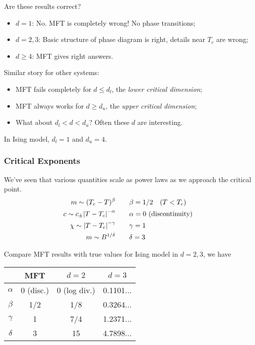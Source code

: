 \documentclass[a4paper,11pt]{article}
\begin{document}
	Are these results correct?
	\begin{itemize}
		\item $d = 1$: No. MFT is completely wrong! No phase transitions;
		\item $d = 2,3$: Basic structure of phase diagram is right, details near $T_c$ are wrong;
		\item $d \geq 4$: MFT gives right answers.
	\end{itemize}

	Similar story for other systems:
	\begin{itemize}
		\item MFT fails completely for $d \leq d_l$, the \emph{lower critical dimension};
		\item MFT always works for $d \geq d_u$, the \emph{upper critical dimension};
		\item What about $d_l < d < d_u$? Often these $d$ are interesting.
	\end{itemize}
	
	In Ising model, $d_l = 1$ and $d_u = 4$.

	\subsubsection{Critical Exponents}

	We've seen that various quantities scale as power laws as we approach the critical point.
	\begin{align*}
		m \sim (T_c - T)^\beta \qquad & \beta = 1/2 \quad (T < T_c)\\
		c \sim c_{\pm} \abs{T - T_c}^{-\alpha} \qquad & \alpha = 0 \text{ (discontinuity)}\\
		\chi \sim \abs{T - T_c}^{-\gamma} \qquad & \gamma = 1\\
		m \sim B^{1/\delta} \qquad & \delta = 3
	\end{align*}

	Compare MFT results with true values for Ising model in $d = 2,3$, we have
	
	\begin{center}
		\begin{tabular}{c|ccc}
			& MFT & $d=2$ & $d=3$ \\
			\hline
			$\alpha$ & 0 (disc.) & 0 (log div.) & 0.1101...\\
			$\beta$ & 1/2 & 1/8 & 0.3264...\\
			$\gamma$ & 1 & 7/4 & 1.2371...\\
			$\delta$ & 3 & 15 & 4.7898...
		\end{tabular}
	\end{center}
\end{document}

